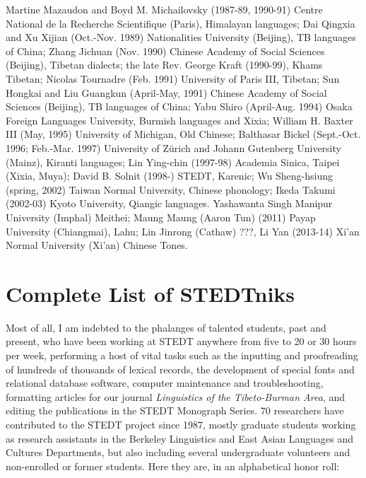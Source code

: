 Martine Mazaudon and Boyd M. Michailovsky (1987-89, 1990-91) Centre National de la Recherche Scientifique (Paris), Himalayan languages; {\sc Dai} Qingxia and {\sc Xu} Xijian (Oct.-Nov. 1989) Nationalities University (Beijing), TB languages of China; {\sc Zhang} Jichuan (Nov. 1990) Chinese Academy of Social Sciences (Beijing), Tibetan dialects; the late Rev. George Kraft (1990-99), Khams Tibetan; Nicolas Tournadre (Feb. 1991) University of Paris III, Tibetan; {\sc Sun} Hongkai and {\sc Liu} Guangkun (April-May, 1991) Chinese Academy of Social Sciences (Beijing), TB languages of China; {\sc Yabu} Shiro (April-Aug. 1994) Osaka Foreign Languages University, Burmish languages and Xixia; William H. Baxter III (May, 1995) University of Michigan, Old Chinese; Balthasar Bickel (Sept.-Oct. 1996; Feb.-Mar. 1997) University of Z\"urich and Johann Gutenberg University (Mainz), Kiranti languages; {\sc Lin} Ying-chin (1997-98) Academia Sinica, Taipei (Xixia, Muya); David B. Solnit (1998-) STEDT, Karenic; {\sc Wu} Sheng-hsiung (spring, 2002) Taiwan Normal University, Chinese phonology; {\sc Ikeda} Takumi (2002-03) Kyoto University, Qiangic languages. Yashawanta Singh  Manipur University (Imphal) Meithei;  Maung Maung (Aaron Tun) (2011) Payap University (Chiangmai), Lahu; Lin Jinrong (Cathaw) ???, Li Yan (2013-14) Xi'an Normal University (Xi'an) Chinese Tones. 

\section{Complete List of STEDTniks}

Most of all, I am indebted to the phalanges of talented students, past and present, who have been working at STEDT anywhere from five to 20 or 30 hours per week, performing a host of vital tasks such as the inputting and proofreading of hundreds of thousands of lexical records, the development of special fonts and relational database software, computer maintenance and troubleshooting, formatting articles for our journal {\it Linguistics of the Tibeto-Burman Area}, and editing the publications in the STEDT Monograph Series. 70 researchers have contributed to the STEDT project since 1987, mostly graduate students working as research assistants in the Berkeley Linguistics and East Asian Languages and Cultures Departments, but also including several undergraduate volunteers and non-enrolled or former students. Here they are, in an alphabetical honor roll:

